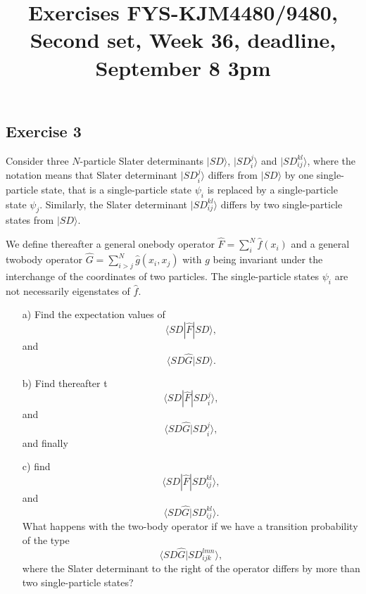 \documentclass[prc]{revtex4}
\begin{document}
\title{Exercises FYS-KJM4480/9480, Second set, Week 36, deadline, September 8 3pm}
\maketitle
\subsection*{Exercise 3}
Consider three $N$-particle 
Slater determinants $|SD\rangle$, $|SD_i^j\rangle$ and $|SD_{ij}^{kl}\rangle$, where the notation means that 
Slater determinant $|SD_i^j\rangle$ differs from $|SD\rangle$ by one single-particle state, that is a single-particle
state $\psi_i$ is replaced by a single-particle state $\psi_j$. Similarly, the Slater determinant $|SD_{ij}^{kl}\rangle$
differs by two single-particle states from $|SD\rangle$.

We define thereafter a general onebody operator $\hat{F} = \sum_{i}^N\hat{f}(x_{i})$ and a general 
twobody operator $\hat{G}=\sum_{i>j}^N\hat{g}(x_{i},x_{j})$
with $g$ being invariant under the interchange of the coordinates of two particles.
The single-particle states $\psi_i$ are not necessarily eigenstates of $\hat{f}$.
\begin{enumerate}
\item[a)] Find the expectation values of 
\[
\langle SD |\hat{F}|SD\rangle,
\]
and
\[
\langle SD\hat{G}|SD\rangle.
\]
\item[b)] Find thereafter t
\[
\langle SD |\hat{F}|SD_i^j\rangle,
\]
and
\[
\langle SD\hat{G}|SD_i^j\rangle,
\]
and finally
\item[c)] find 
\[
\langle SD |\hat{F}|SD_{ij}^{kl}\rangle,
\]
and
\[
\langle SD\hat{G}|SD_{ij}^{kl}\rangle.
\]
What happens with the two-body operator if we have a transition probability  of the type
\[
\langle SD\hat{G}|SD_{ijk}^{lmn}\rangle,
\]
where the Slater determinant to the right of the operator differs by more than two single-particle states?
\end{enumerate}
\end{document}

